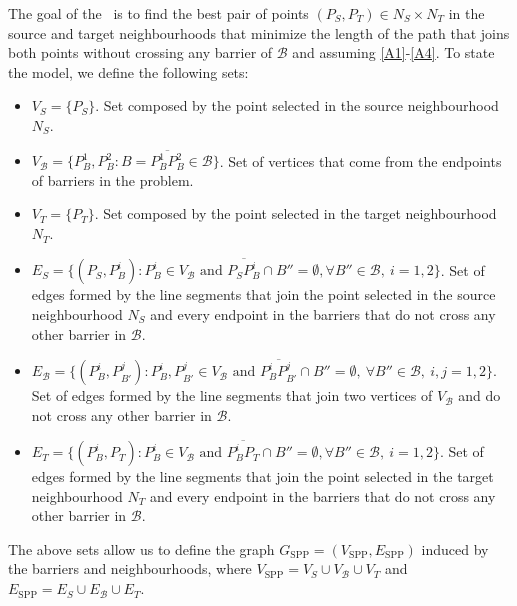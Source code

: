 \documentclass[a4paper,  review, authoryear, 1p.]{elsarticle}
\newcommand{\SPPN}{{\sf{H-SPPN}\xspace }}
\newcommand{\B}{{\mathcal B}}
\newcommand{\VB}{{V^{}_{\mathcal B}}}
\newcommand{\EB}{{E^{}_{\mathcal B}}}
\newcommand{\VS}{{V^{}_{S}}}
\newcommand{\ES}{{E^{}_{S}}}
\newcommand{\VT}{{V^{}_{T}}}
\newcommand{\ET}{{E^{}_{T}}}
\newcommand{\GSPP}{{G_{\text{SPP}}}}
\newcommand{\VSPP}{{V_{\text{SPP}}}}
\newcommand{\ESPP}{{E_{\text{SPP}}}}
\newcommand{\CV}[1]{{\color{red}#1}}
\begin{document}
		The goal of the \SPPN \ is to find the best pair of points $(P_{S}, P_{T})\in N_S\times N_T$ in the source and target neighbourhoods that minimize the length of the path that joins both points without crossing any barrier of $\mathcal B$ and assuming \ref{A1}-\ref{A4}. To state the model,  we define the following sets:
		\begin{itemize}
			\item $\VS=\{P_S\}$. Set composed by the point selected in the source neighbourhood $N_S$.
			\item $\VB=\{P^1_B, P^2_B:B=\overline{P^1_B P^2_B}\in \mathcal B\}$. Set of vertices that come from the endpoints of barriers in the problem.
			\item $\VT=\{P^{}_T\}$. Set composed by the point selected in the target neighbourhood $N_T$.
			\item $\ES=\{(P_S, P^i_{B}):P^i_B\in V_\B\text{ and } \overline{P_SP^i_B}\cap B''=\emptyset,\forall B''\in\B,\:i=1,2\}$. Set of edges formed by the line segments that join the point selected in the source neighbourhood $N_S$ and every endpoint in the barriers that do not cross any other barrier in $\B$.
			\item $\EB=\{(P^{i}_B, P^{j}_{B'}):P^i_B, P^j_{B'}\in \VB \text{ and } \overline{P^i_B P^j_{B'}}\cap B''=\emptyset,\:\forall B''\in\mathcal B,\:i, j=1,2\}$. Set of edges formed by the line segments that join two vertices of $V_{\mathcal B}$ and do not cross any other barrier in $\B$.
			\item $\ET=\{(P^i_{B}, P^{}_T):P^i_B\in V_\B\text{ and } \overline{P^i_BP^{}_T}\cap B''=\emptyset,\forall B''\in\B,\:i=1,2\}$. Set of edges formed by the line segments that join the point selected in the target neighbourhood $N_T$ and every endpoint in the barriers that do not cross any other barrier in $\B$.
		\end{itemize} 
		
		The above sets allow us to define the graph $\GSPP= (\VSPP, \ESPP)$ induced by the barriers and neighbourhoods, where $\VSPP=\VS\cup \VB\cup\VT$ and $\ESPP=\ES\cup\EB \cup\ET$. 
		
\end{document}
